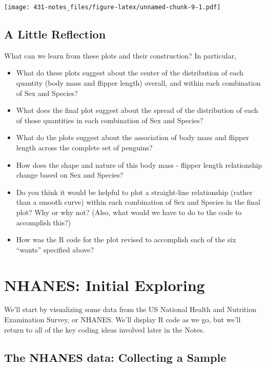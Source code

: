 \documentclass[
]{book}
\providecommand{\tightlist}{%
  \setlength{\itemsep}{0pt}\setlength{\parskip}{0pt}}
\begin{document}
\texttt{[image: 431-notes\_files/figure-latex/unnamed-chunk-9-1.pdf]}

\hypertarget{a-little-reflection}{%
\section{A Little Reflection}\label{a-little-reflection}}

What can we learn from these plots and their construction? In particular,

\begin{itemize}
\tightlist
\item
  What do these plots suggest about the center of the distribution of each quantity (body mass and flipper length) overall, and within each combination of Sex and Species?
\item
  What does the final plot suggest about the spread of the distribution of each of those quantities in each combination of Sex and Species?
\item
  What do the plots suggest about the association of body mass and flipper length across the complete set of penguins?
\item
  How does the shape and nature of this body mass - flipper length relationship change based on Sex and Species?
\item
  Do you think it would be helpful to plot a straight-line relationship (rather than a smooth curve) within each combination of Sex and Species in the final plot? Why or why not? (Also, what would we have to do to the code to accomplish this?)
\item
  How was the R code for the plot revised to accomplish each of the six ``wants'' specified above?
\end{itemize}

\hypertarget{dataviz}{%
\chapter{NHANES: Initial Exploring}\label{dataviz}}

We'll start by visualizing some data from the US National Health and Nutrition Examination Survey, or NHANES. We'll display R code as we go, but we'll return to all of the key coding ideas involved later in the Notes.

\hypertarget{the-nhanes-data-collecting-a-sample}{%
\section{The NHANES data: Collecting a Sample}\label{the-nhanes-data-collecting-a-sample}}
\end{document}
